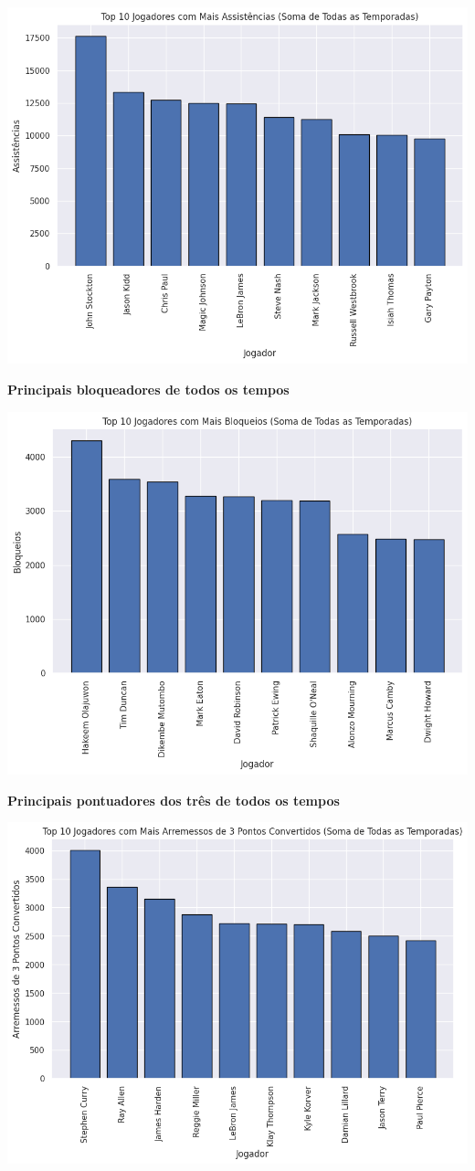 \documentclass[
]{book}
\begin{document}
\includegraphics{imagens/17.png}

\textbf{Principais bloqueadores de todos os tempos}

\includegraphics{imagens/18.png}

\textbf{Principais pontuadores dos três de todos os tempos}

\includegraphics{imagens/19.png}
\end{document}

